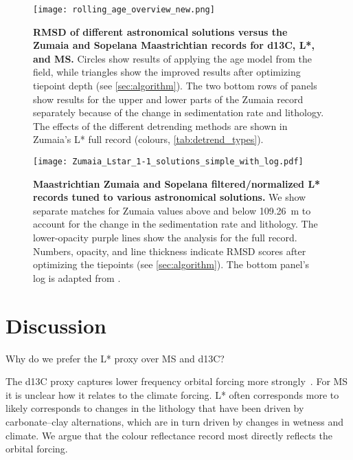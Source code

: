 \documentclass[draft]{agujournal2019}
\begin{document}
\begin{figure}[htb]
  \centering
  \texttt{[image: rolling\_age\_overview\_new.png]}
  \caption{\label{fig:rolling-rmsd}
    \textbf{\gls{RMSD} of different astronomical solutions versus the Zumaia and Sopelana Maastrichtian records for \gls{d13C}, \gls{L*}, and \gls{MS}.}
    Circles show results of applying the age model from the field, while triangles show the improved results after optimizing tiepoint depth (see \cref{sec:algorithm}).
    The two bottom rows of panels show results for the upper and lower parts of the Zumaia record separately because of the change in sedimentation rate and lithology.
    The effects of the different detrending methods are shown in Zumaia's \gls{L*} full record (colours, \cref{tab:detrend_types}).
}
\end{figure}

\begin{figure}[htb]
  \centering
  \texttt{[image: Zumaia\_Lstar\_1-1\_solutions\_simple\_with\_log.pdf]}
  \caption{\label{fig:rolling-depth-age}
    \textbf{Maastrichtian Zumaia and Sopelana filtered/normalized \gls{L*} records tuned to various astronomical solutions.}
    We show separate matches for Zumaia values above and below \qty{109.26}{\metre} to account for the change in the sedimentation rate and lithology.
    The lower-opacity purple lines show the analysis for the full record.
    Numbers, opacity, and line thickness indicate \gls{RMSD} scores after optimizing the tiepoints (see \cref{sec:algorithm}).
    The bottom panel's log is adapted from .
    }
\end{figure}



\section{Discussion}\label{sec:discussion}


Why do we prefer the \gls{L*} proxy over \gls{MS} and \gls{d13C}?

The \gls{d13C} proxy captures lower frequency orbital forcing more strongly~\cite{Zeebe2017,Kocken2019loscar}.
For \gls{MS} it is unclear how it relates to the climate forcing. %
\gls{L*} often corresponds more to likely corresponds to changes in the lithology that have been driven by carbonate--clay alternations, which are in turn driven by changes in wetness and climate.
We argue that the colour reflectance record most directly reflects the orbital forcing.
\end{document}
